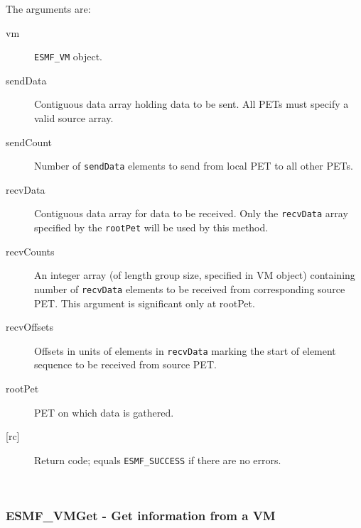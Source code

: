      The arguments are:
     \begin{description}
     \item[vm] 
          {\tt ESMF\_VM} object.
     \item[sendData]
          Contiguous data array holding data to be sent. All PETs must specify a
          valid source array.
     \item[sendCount] 
          Number of {\tt sendData} elements to send from local PET to all other
          PETs.
     \item[recvData] 
          Contiguous data array for data to be received. Only the {\tt recvData}
          array specified by the {\tt rootPet} will be used by this method.
     \item[recvCounts] 
          An integer array (of length group size, specified in VM object) containing 
          number of {\tt recvData} elements to be received from corresponding
          source PET. This argument is significant only at rootPet.
     \item[recvOffsets] 
          Offsets in units of elements in {\tt recvData} marking the start of
          element sequence to be received from source PET.
     \item[rootPet]
          PET on which data is gathered.
     \item[{[rc]}] 
          Return code; equals {\tt ESMF\_SUCCESS} if there are no errors.
     \end{description}
   
 
\mbox{}\hrulefill\ 
 
\subsubsection [ESMF\_VMGet] {ESMF\_VMGet - Get information from a VM}


